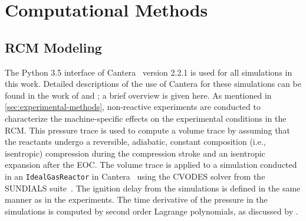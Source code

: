 \documentclass[12pt]{../ussci}
\begin{document}

\section{Computational Methods}\label{sec:computational-methods}
\subsection{RCM Modeling}\label{sec:experimental-modeling}

The Python 3.5 interface of Cantera~\autocite{cantera} version 2.2.1 is used for
all simulations in this work. Detailed descriptions of the use of Cantera for
these simulations can be found in the work of \textcite{Weber2016a} and
\textcite{Dames2016}; a brief overview is given here. As mentioned in
\cref{sec:experimental-methods}, non-reactive experiments are conducted to
characterize the machine-specific effects on the experimental conditions in the
RCM. This pressure trace is used to compute a volume trace by assuming that the
reactants undergo a reversible, adiabatic, constant composition (i.e.,
isentropic) compression during the compression stroke and an isentropic
expansion after the EOC. The volume trace is applied to a simulation conducted
in an \verb|IdealGasReactor| in Cantera~\autocite{cantera} using the CVODES
solver from the SUNDIALS suite~\autocite{Hindmarsh2005}. The ignition delay from
the simulations is defined in the same manner as in the experiments. The time
derivative of the pressure in the simulations is computed by second order
Lagrange polynomials, as discussed by \textcite{Chapra2010}.
\end{document}
